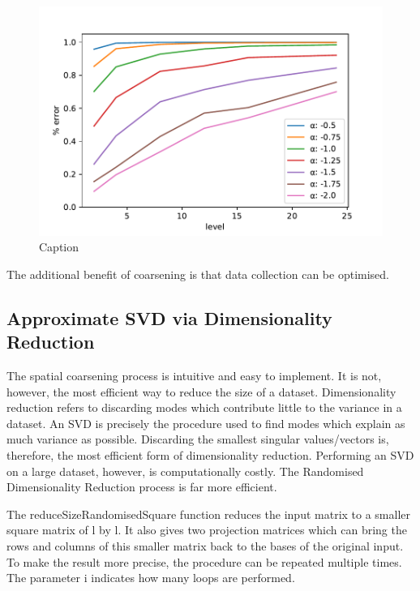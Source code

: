 \documentclass{acm_proc_article-sp}
\begin{document}
\begin{figure}[h]
\begin{center}
\includegraphics[scale=0.5]{Results/plotProductSpatialTemporalFieldsViaCoarsening.pdf}
\caption[Small caption]{Caption}
\label{fig:plotProductSpatialTemporalFieldsViaCoarsening}
\end{center}
\end{figure}

The additional benefit of coarsening is that data collection can be optimised.

\subsection{Approximate SVD via Dimensionality Reduction}
\label{sec:Techniques Approximate SVD via Dimensionality Reduction}

The spatial coarsening process is intuitive and easy to implement. It is not, however, the most efficient way to reduce the size of a dataset. Dimensionality reduction refers to discarding modes which contribute little to the variance in a dataset. An SVD is precisely the procedure used to find modes which explain as much variance as possible. Discarding the smallest singular values/vectors is, therefore, the most efficient form of dimensionality reduction. Performing an SVD on a large dataset, however, is computationally costly. The Randomised Dimensionality Reduction process is far more efficient.

The reduceSizeRandomisedSquare function reduces the input matrix to a smaller square matrix of l by l. It also gives two projection matrices which can bring the rows and columns of this smaller matrix back to the bases of the original input. To make the result more precise, the procedure can be repeated multiple times. The parameter i indicates how many loops are performed.
\end{document}
